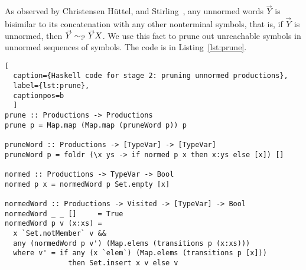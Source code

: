 
As observed by Christensen H\"uttel, and
Stirling~\cite{DBLP:journals/iandc/ChristensenHS95}, any unnormed
words $\vec Y$ is bisimilar to its concatenation with any other
nonterminal symbols, that is, if $\vec Y$ is unnormed, then
$\vec Y \sim_\mathcal P \vec YX$.
%
%
We use this fact
to prune out unreachable symbols in unnormed sequences of symbols. The
code is in Listing~\ref{lst:prune}.
%

\begin{lstlisting}[
  caption={Haskell code for stage 2: pruning unnormed productions},
  label={lst:prune},
  captionpos=b
  ]
prune :: Productions -> Productions
prune p = Map.map (Map.map (pruneWord p)) p

pruneWord :: Productions -> [TypeVar] -> [TypeVar]
pruneWord p = foldr (\x ys -> if normed p x then x:ys else [x]) []

normed :: Productions -> TypeVar -> Bool
normed p x = normedWord p Set.empty [x]

normedWord :: Productions -> Visited -> [TypeVar] -> Bool
normedWord _ _ []     = True
normedWord p v (x:xs) =
  x `Set.notMember` v &&
  any (normedWord p v') (Map.elems (transitions p (x:xs)))
  where v' = if any (x `elem`) (Map.elems (transitions p [x]))
               then Set.insert x v else v
\end{lstlisting}

